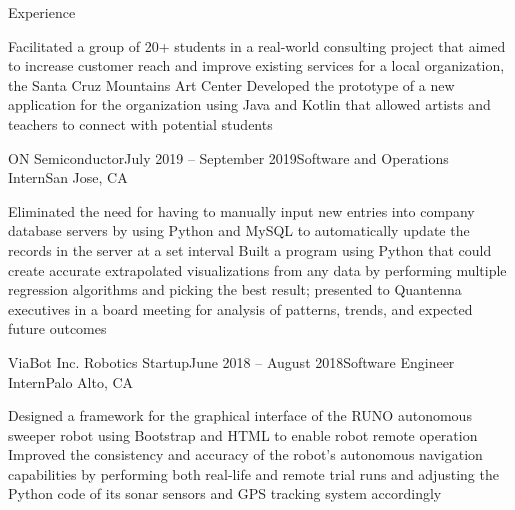 \documentclass[fit]{cvtemplate}
\begin{document}
\begin{cvtext}
\begin{cvsection}{Experience}
\begin{cvsubsection}
    \listitem Facilitated a group of 20+ students in a real-world consulting project that aimed to increase customer reach and improve existing services for a local organization, the Santa Cruz Mountains Art Center
    \listitem Developed the prototype of a new application for the organization using Java and Kotlin that allowed artists and teachers to connect with potential students

  \end{cvsubsection}


  \begin{cvsubsection}
    {ON Semiconductor}{July 2019 -- September 2019}{Software and Operations Intern}{San Jose, CA}

    \listitem Eliminated the need for having to manually input new entries into company database servers by using Python and MySQL to automatically update the records in the server at a set interval
    \listitem Built a program using Python that could create accurate extrapolated visualizations from any data by performing multiple regression algorithms and picking the best result; presented to Quantenna executives in a board meeting for analysis of patterns, trends, and expected future outcomes

  \end{cvsubsection}


  \begin{cvsubsection}
    {ViaBot Inc. Robotics Startup}{June 2018 -- August 2018}{Software Engineer Intern}{Palo Alto, CA}

    \listitem Designed a framework for the graphical interface of the RUNO autonomous sweeper robot using Bootstrap and HTML to enable robot remote operation
    \listitem Improved the consistency and accuracy of the robot's autonomous navigation capabilities by performing both real-life and remote trial runs and adjusting the Python code of its sonar sensors and GPS tracking system accordingly

  \end{cvsubsection}


\end{cvsection}



\end{cvtext}
\end{document}
